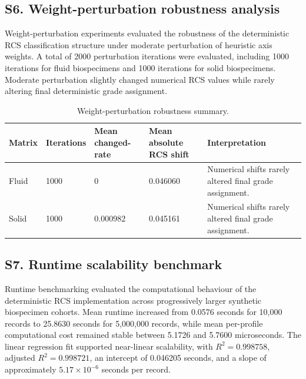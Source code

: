 \documentclass[preprint,12pt]{elsarticle}
\begin{document}
\FloatBarrier

\subsection*{S6. Weight-perturbation robustness analysis}

Weight-perturbation experiments evaluated the robustness of the deterministic RCS classification structure under moderate perturbation of heuristic axis weights. A total of 2000 perturbation iterations were evaluated, including 1000 iterations for fluid biospecimens and 1000 iterations for solid biospecimens. Moderate perturbation slightly changed numerical RCS values while rarely altering final deterministic grade assignment.

\begin{table}[!htbp]
\caption{Weight-perturbation robustness summary.}
\label{tab:perturbation_robustness_summary}
\centering
\footnotesize
\setlength{\tabcolsep}{4pt}
\renewcommand{\arraystretch}{1.10}

\begin{tabular}{@{}C{2.0cm}C{2.0cm}C{2.8cm}C{3.0cm}L{4.0cm}@{}}
\toprule
\textbf{Matrix}
& \textbf{Iterations}
& \textbf{Mean changed-rate}
& \textbf{Mean absolute RCS shift}
& \textbf{Interpretation} \\
\midrule

Fluid
& 1000
& 0
& 0.046060
& Numerical shifts rarely altered final grade assignment. \\

Solid
& 1000
& 0.000982
& 0.045161
& Numerical shifts rarely altered final grade assignment. \\

\bottomrule
\end{tabular}
\end{table}

\FloatBarrier

\subsection*{S7. Runtime scalability benchmark}

Runtime benchmarking evaluated the computational behaviour of the deterministic RCS implementation across progressively larger synthetic biospecimen cohorts. Mean runtime increased from 0.0576 seconds for 10,000 records to 25.8630 seconds for 5,000,000 records, while mean per-profile computational cost remained stable between 5.1726 and 5.7600 microseconds. The linear regression fit supported near-linear scalability, with \(R^2=0.998758\), adjusted \(R^2=0.998721\), an intercept of 0.046205 seconds, and a slope of approximately \(5.17\times10^{-6}\) seconds per record.
\end{document}

